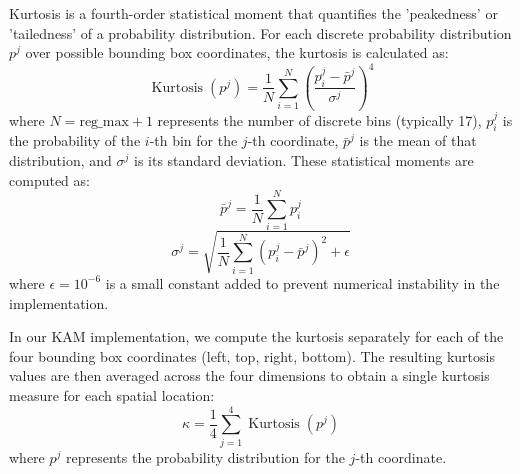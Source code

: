 Kurtosis is a fourth-order statistical moment that quantifies the 'peakedness' or 'tailedness' of a probability distribution. For each discrete probability distribution $p^j$ over possible bounding box coordinates, the kurtosis is calculated as:
\begin{equation}
\operatorname{Kurtosis}(p^j)=\frac{1}{N} \sum_{i=1}^{N}\left(\frac{p^j_{i}-\bar{p}^j}{\sigma^j}\right)^{4}
\end{equation}
where $N = \text{reg\_max} + 1$ represents the number of discrete bins (typically 17), $p^j_i$ is the probability of the $i$-th bin for the $j$-th coordinate, $\bar{p}^j$ is the mean of that distribution, and $\sigma^j$ is its standard deviation. These statistical moments are computed as:
\begin{equation}
\bar{p}^j=\frac{1}{N} \sum_{i=1}^{N} p^j_{i}
\end{equation}
\begin{equation}
\sigma^j=\sqrt{\frac{1}{N} \sum_{i=1}^{N}(p^j_i-\bar{p}^j)^2 + \epsilon}
\end{equation}
where $\epsilon = 10^{-6}$ is a small constant added to prevent numerical instability in the implementation.

In our KAM implementation, we compute the kurtosis separately for each of the four bounding box coordinates (left, top, right, bottom). The resulting kurtosis values are then averaged across the four dimensions to obtain a single kurtosis measure for each spatial location:
\begin{equation}
\kappa = \frac{1}{4}\sum_{j=1}^{4}\operatorname{Kurtosis}(p^j)
\end{equation}
where $p^j$ represents the probability distribution for the $j$-th coordinate.


